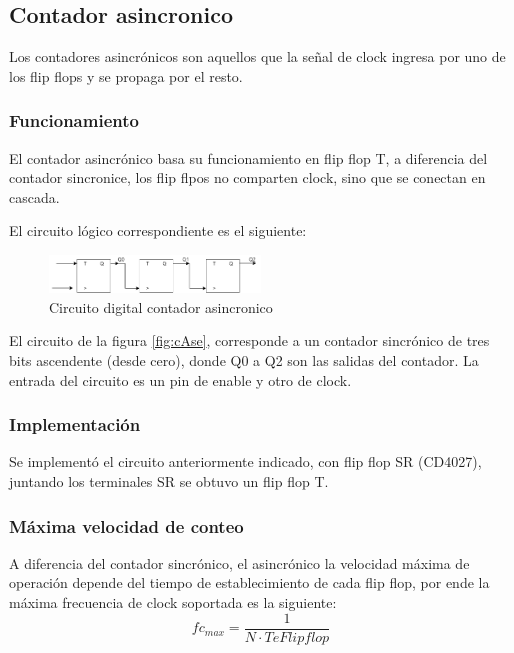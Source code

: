 \documentclass[../../e3_tp2_main.tex]{subfiles}
\begin{document}
\subsection{Contador asincronico}
Los contadores asincrónicos son aquellos que la señal de clock ingresa por uno de los flip flops y se propaga por el resto.

\subsubsection{Funcionamiento}

El contador asincrónico basa su funcionamiento en flip flop T, a diferencia del contador sincronice, los flip flpos no comparten clock, sino que se conectan en cascada. 
\par El circuito lógico correspondiente es el siguiente:


\begin{figure}[H]	
	\centering
	\includegraphics[width=0.5\textwidth]{imagenes/cas_b.png}
	\caption{Circuito digital contador asincronico}\label{fig:case}
\end{figure}

El circuito de la figura \ref{fig:cAse}, corresponde a un contador sincrónico de tres bits ascendente (desde cero), donde Q0 a Q2 son las salidas del contador. La entrada del circuito es un pin de enable y otro de clock.

\subsubsection{Implementación}
Se implementó el circuito anteriormente indicado, con flip flop SR (CD4027), juntando los terminales SR se obtuvo un flip flop T.

\subsubsection{Máxima velocidad de conteo}
A diferencia del contador sincrónico, el asincrónico la velocidad máxima de operación depende del tiempo de establecimiento de cada flip flop, por ende la máxima frecuencia de clock soportada es la siguiente:
$$fc_{max}=\frac{1}{N \cdot TeFlipflop } $$
\end{document}
